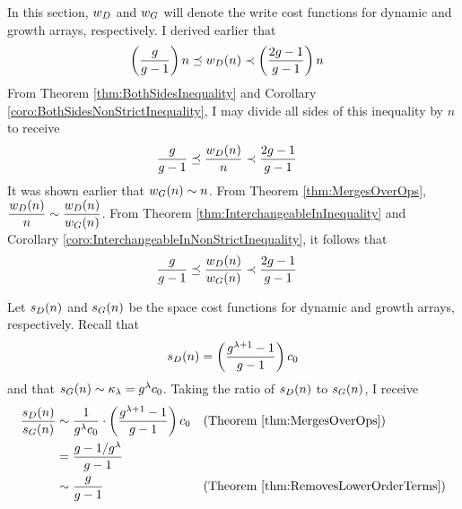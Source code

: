 \HdrTimeComplexCmp

In this section, $w_D$ and $w_G$ will denote the write cost functions for dynamic and growth arrays, respectively. I derived earlier that
\begin{align*}
\left( \frac{g}{g - 1} \right) n \preceq w_D(n) &\prec \left( \frac{2g - 1}{g - 1} \right) n
\end{align*}
From Theorem \ref{thm:BothSidesInequality} and Corollary \ref{coro:BothSidesNonStrictInequality}, I may divide all sides of this inequality by $n$ to receive
\begin{align*}
\frac{g}{g - 1} \preceq \frac {w_D(n)} n &\prec \frac{2g - 1}{g - 1}
\end{align*}
It was shown earlier that $w_G(n) \sim n$. From Theorem \ref{thm:MergesOverOps}, $\dfrac {w_D(n)} n \sim \dfrac{w_D(n)}{w_G(n)}$. From Theorem \ref{thm:InterchangeableInInequality} and Corollary \ref{coro:InterchangeableInNonStrictInequality}, it follows that
\begin{align*}
\frac{g}{g - 1} \preceq \frac {w_D(n)} {w_G(n)} &\prec \frac{2g - 1}{g - 1}
\end{align*}
\HdrSpaceComplexCmp

Let $s_D(n)$ and $s_G(n)$ be the space cost functions for dynamic and growth arrays, respectively. Recall that
\begin{align*}
s_D(n) = \left( \frac{g^{\lambda + 1} - 1}{g - 1} \right) c_0
\end{align*}
and that $s_G(n) \sim \kappa_\lambda = g^\lambda c_0$. Taking the ratio of $s_D(n)$ to $s_G(n)$, I receive
\begin{align*}
\frac{s_D(n)}{s_G(n)} &\sim \frac{1}{g^\lambda c_0} \cdot \left( \frac{g^{\lambda + 1} - 1}{g - 1} \right) c_0 &&\text{(Theorem \ref{thm:MergesOverOps})}\\
&= \frac{g - 1 / {g^\lambda}}{g - 1}\\
&\sim \frac{g}{g - 1} &&\text{(Theorem \ref{thm:RemovesLowerOrderTerms})}
\end{align*}